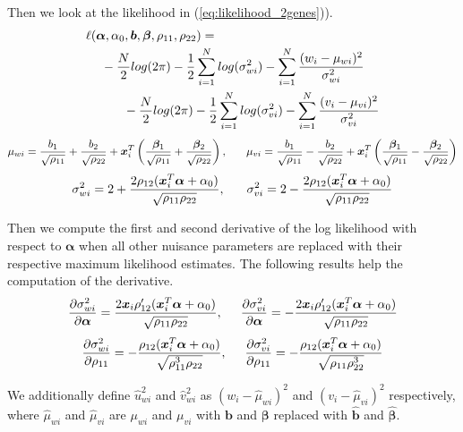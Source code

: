 \documentclass[aap,authoryear, preprint]{imsart}
\numberwithin{equation}{section}
\theoremstyle{plain}
\begin{document}
Then we look at the likelihood in (\ref{eq:likelihood_2genes})).
\begin{equation}
\begin{multlined}
\ell(\bm{\alpha}, \alpha_0, \bm{b}, \bm{\beta}, \rho_{11}, \rho_{22}) = \\
-\frac{N}{2} log(2\pi) - \frac{1}{2} \sum_{i=1}^{N} log (\sigma_{wi}^2) - \sum_{i=1}^{N} \frac{(w_i - \mu_{wi})^2}{\sigma_{wi}^2}\\
\hspace{7mm} -\frac{N}{2} log(2\pi) - \frac{1}{2} \sum_{i=1}^{N} log (\sigma_{vi}^2) - \sum_{i=1}^{N} \frac{(v_i - \mu_{vi})^2}{\sigma_{vi}^2}
\end{multlined}
    \label{eq:likelihood_2genes_appendix}
\end{equation}
$$\mu_{wi} = \frac{{b}_1}{\sqrt{\rho_{11}}} + \frac{{b}_2}{\sqrt{\rho_{22}}} + \bm{x}_i^T \left(\frac{\bm{\beta}_1}{\sqrt{\rho_{11}}} + \frac{\bm{\beta}_2}{\sqrt{\rho_{22}}}\right), \hspace{6mm} 
\mu_{vi} = \frac{{b}_1}{\sqrt{\rho_{11}}} - \frac{{b}_2}{\sqrt{\rho_{22}}} + \bm{x}_i^T \left(\frac{\bm{\beta}_1}{\sqrt{\rho_{11}}} - \frac{\bm{\beta}_2}{\sqrt{\rho_{22}}}\right)$$
$$\sigma_{wi}^2 = 2 + \frac{2\rho_{12}(\bm{x}_i^T\bm{\alpha} + \alpha_0)}{\sqrt{\rho_{11}\rho_{22}}}, \hspace{6mm} \sigma_{vi}^2 = 2 - \frac{2\rho_{12}(\bm{x}_i^T\bm{\alpha} + \alpha_0)}{\sqrt{\rho_{11}\rho_{22}}}$$

Then we compute the first and second derivative of the log likelihood with respect to $\bm{\alpha}$ when all other nuisance parameters are replaced with their respective maximum likelihood estimates. The following results help the computation of the derivative.
$$
\frac{\partial \sigma_{wi}^2}{\partial \bm{\alpha}} = \frac{2\bm{x}_i \rho_{12}'(\bm{x}_i^T \bm{\alpha} + \alpha_0)}{\sqrt{\rho_{11}\rho_{22}}}, \hspace{5mm}
\frac{\partial \sigma_{vi}^2}{\partial \bm{\alpha}} = -\frac{2\bm{x}_i \rho_{12}'(\bm{x}_i^T \bm{\alpha} + \alpha_0)}{\sqrt{\rho_{11}\rho_{22}}}
$$
$$\frac{\partial \sigma_{wi}^2}{\partial \rho_{11}} = -\frac{\rho_{12}(\bm{x}_i^T\bm{\alpha} + \alpha_0)}{\sqrt{\rho_{11}^3\rho_{22}}}, \hspace{5mm}
\frac{\partial \sigma_{vi}^2}{\partial \rho_{11}} = -\frac{\rho_{12}(\bm{x}_i^T\bm{\alpha} + \alpha_0)}{\sqrt{\rho_{11}\rho_{22}^3}}$$

\noindent We additionally define $\hat{u}_{wi}^2$ and $\hat{v}_{wi}^2$ as $(w_i - \hat{\mu}_{wi})^2$ and $(v_i-\hat{\mu}_{vi})^2$ respectively, where $\hat{\mu}_{wi}$ and $\hat{\mu}_{vi}$ are $\mu_{wi}$ and $\mu_{vi}$ with $\bm{b}$ and $\bm{\beta}$ replaced with $\hat{\bm{b}}$ and $\hat{\bm{\beta}}$.\\
\end{document}

